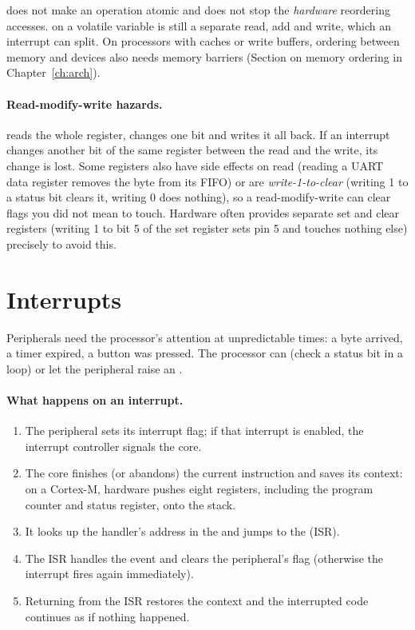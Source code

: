 \begin{trap}
 does not make an operation atomic and does not stop the \emph{hardware} reordering accesses.  on a volatile variable is still a separate read, add and write, which an interrupt can split. On processors with caches or write buffers, ordering between memory and devices also needs memory barriers (Section on memory ordering in Chapter~\ref{ch:arch}).
\end{trap}

\paragraph{Read-modify-write hazards.}  reads the whole register, changes one bit and writes it all back. If an interrupt changes another bit of the same register between the read and the write, its change is lost. Some registers also have side effects on read (reading a UART data register removes the byte from its FIFO) or are \emph{write-1-to-clear} (writing 1 to a status bit clears it, writing 0 does nothing), so a read-modify-write can clear flags you did not mean to touch. Hardware often provides separate set and clear registers (writing 1 to bit 5 of the set register sets pin 5 and touches nothing else) precisely to avoid this.

\section{Interrupts}

Peripherals need the processor's attention at unpredictable times: a byte arrived, a timer expired, a button was pressed. The processor can  (check a status bit in a loop) or let the peripheral raise an .

\paragraph{What happens on an interrupt.}
\begin{enumerate}
  \item The peripheral sets its interrupt flag; if that interrupt is enabled, the interrupt controller signals the core.
  \item The core finishes (or abandons) the current instruction and saves its context: on a Cortex-M, hardware pushes eight registers, including the program counter and status register, onto the stack.
  \item It looks up the handler's address in the  and jumps to the  (ISR).
  \item The ISR handles the event and clears the peripheral's flag (otherwise the interrupt fires again immediately).
  \item Returning from the ISR restores the context and the interrupted code continues as if nothing happened.
\end{enumerate}

